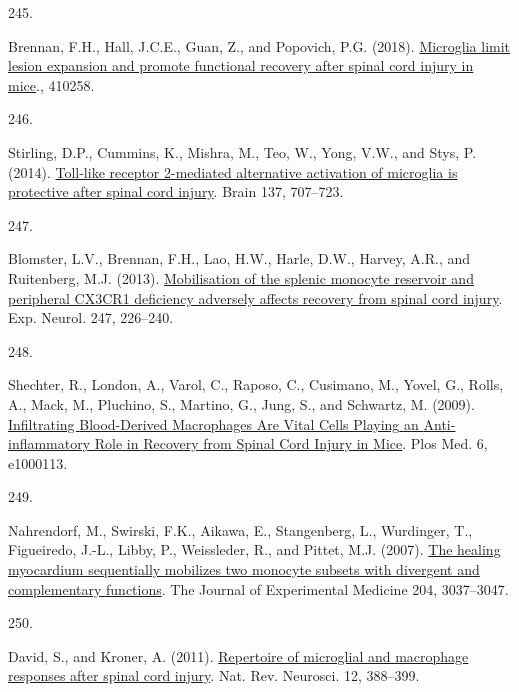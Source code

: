 \documentclass[
]{article}
\newlength{\cslhangindent}
\newlength{\csllabelwidth}
\newlength{\cslentryspacingunit} %
\newenvironment{CSLReferences}[2] %
 {%
  \setlength{\parindent}{0pt}
  \ifodd #1
  \let\oldpar\par
  \def\par{\hangindent=\cslhangindent\oldpar}
  \fi
  \setlength{\parskip}{#2\cslentryspacingunit}
 }%
 {}
\newcommand{\CSLLeftMargin}[1]{\parbox[t]{\csllabelwidth}{#1}}
\newcommand{\CSLRightInline}[1]{\parbox[t]{\linewidth - \csllabelwidth}{#1}\break}
\begin{document}
\begin{CSLReferences}{0}{0}
\leavevmode{}%
\CSLLeftMargin{245. }
\CSLRightInline{Brennan, F.H., Hall, J.C.E., Guan, Z., and Popovich, P.G. (2018). \href{https://doi.org/10.1101/410258}{Microglia limit lesion expansion and promote functional recovery after spinal cord injury in mice}., 410258.}

\leavevmode{}%
\CSLLeftMargin{246. }
\CSLRightInline{Stirling, D.P., Cummins, K., Mishra, M., Teo, W., Yong, V.W., and Stys, P. (2014). \href{https://doi.org/10.1093/brain/awt341}{Toll-like receptor 2-mediated alternative activation of microglia is protective after spinal cord injury}. Brain 137, 707--723.}

\leavevmode{}%
\CSLLeftMargin{247. }
\CSLRightInline{Blomster, L.V., Brennan, F.H., Lao, H.W., Harle, D.W., Harvey, A.R., and Ruitenberg, M.J. (2013). \href{https://doi.org/10.1016/j.expneurol.2013.05.002}{Mobilisation of the splenic monocyte reservoir and peripheral {CX3CR1} deficiency adversely affects recovery from spinal cord injury}. Exp. Neurol. 247, 226--240.}

\leavevmode{}%
\CSLLeftMargin{248. }
\CSLRightInline{Shechter, R., London, A., Varol, C., Raposo, C., Cusimano, M., Yovel, G., Rolls, A., Mack, M., Pluchino, S., Martino, G., Jung, S., and Schwartz, M. (2009). \href{https://doi.org/10.1371/journal.pmed.1000113}{Infiltrating {Blood-Derived Macrophages Are Vital Cells Playing} an {Anti-inflammatory Role} in {Recovery} from {Spinal Cord Injury} in {Mice}}. Plos Med. 6, e1000113.}

\leavevmode{}%
\CSLLeftMargin{249. }
\CSLRightInline{Nahrendorf, M., Swirski, F.K., Aikawa, E., Stangenberg, L., Wurdinger, T., Figueiredo, J.-L., Libby, P., Weissleder, R., and Pittet, M.J. (2007). \href{https://doi.org/10.1084/jem.20070885}{The healing myocardium sequentially mobilizes two monocyte subsets with divergent and complementary functions}. The Journal of Experimental Medicine 204, 3037--3047.}

\leavevmode{}%
\CSLLeftMargin{250. }
\CSLRightInline{David, S., and Kroner, A. (2011). \href{https://doi.org/10.1038/nrn3053}{Repertoire of microglial and macrophage responses after spinal cord injury}. Nat. Rev. Neurosci. 12, 388--399.}


\end{CSLReferences}
\end{document}
